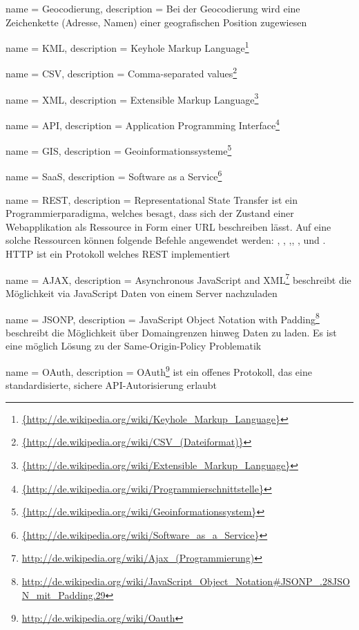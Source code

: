  {
	name = Geocodierung,
	description = {Bei der Geocodierung wird eine Zeichenkette (Adresse, Namen) einer geografischen Position zugewiesen}
}

 {
	name = KML,
	description = {Keyhole Markup Language\footnote{\url{{http://de.wikipedia.org/wiki/Keyhole_Markup_Language}}}}
}

 {
	name = CSV,
	description = {Comma-separated values\footnote{\url{{http://de.wikipedia.org/wiki/CSV_(Dateiformat)}}}}
}

 {
	name = XML,
	description = {Extensible Markup Language\footnote{\url{{http://de.wikipedia.org/wiki/Extensible_Markup_Language}}}}
}

 {
	name = API,
	description = {Application Programming Interface\footnote{\url{{http://de.wikipedia.org/wiki/Programmierschnittstelle}}}}
}

 {
	name = GIS,
	description = {Geoinformationssysteme\footnote{\url{{http://de.wikipedia.org/wiki/Geoinformationssystem}}}}
}

 {
	name = SaaS,
	description = {Software as a Service\footnote{\url{{http://de.wikipedia.org/wiki/Software_as_a_Service}}}}
}

 {
	name = REST,
	description = {Representational State Transfer\cite{rest} ist ein Programmierparadigma, welches besagt, dass sich der Zustand einer Webapplikation als Ressource in Form einer URL beschreiben lässt. Auf eine solche Ressourcen können folgende Befehle angewendet werden: , , ,, ,  und . HTTP ist ein Protokoll welches REST implementiert}
}

 {
	name = AJAX,
	description = {Asynchronous JavaScript and XML\footnote{\url{http://de.wikipedia.org/wiki/Ajax_(Programmierung)}} beschreibt die Möglichkeit via JavaScript Daten von einem Server nachzuladen}
}

 {
	name = JSONP,
	description = {JavaScript Object Notation with Padding\footnote{\url{http://de.wikipedia.org/wiki/JavaScript_Object_Notation\#JSONP_.28JSON_mit_Padding.29}} beschreibt die Möglichkeit über Domaingrenzen hinweg Daten zu laden. Es ist eine möglich Lösung zu der Same-Origin-Policy Problematik\cite{sop}}
}

 {
	name = OAuth,
	description = {OAuth\footnote{\url{http://de.wikipedia.org/wiki/Oauth}} ist ein offenes Protokoll, das eine standardisierte, sichere API-Autorisierung erlaubt}
}


